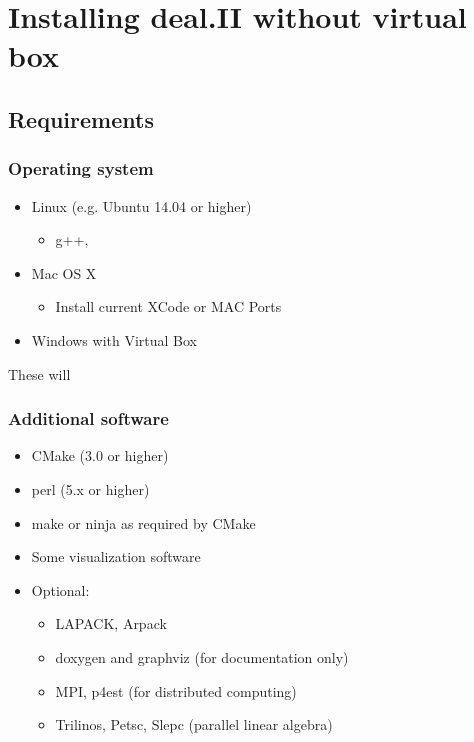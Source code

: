 \section[Installing]{Installing deal.II without virtual box}
\subsection{Requirements}

\begin{frame}
  \frametitle{Operating system}
  \begin{itemize}
  \item Linux (e.g. Ubuntu 14.04 or higher)
    \begin{itemize}
    \item g++, 
    \end{itemize}
  \item Mac OS X
    \begin{itemize}
    \item Install current XCode or MAC Ports
    \end{itemize}
  \item Windows with Virtual Box
  \end{itemize}
  These will 
\end{frame}

\begin{frame}
  \frametitle{Additional software}
  \begin{itemize}
  \item CMake (3.0 or higher)
  \item perl (5.x or higher)
     \item make or ninja as required by CMake
  \item Some visualization software
    \item Optional: 
    \begin{itemize}
    \item LAPACK, Arpack
    \item doxygen and graphviz (for documentation only)
    \item MPI, p4est (for distributed computing)
    \item Trilinos, Petsc, Slepc (parallel linear algebra)
    \end{itemize}
  \end{itemize}
\end{frame}


